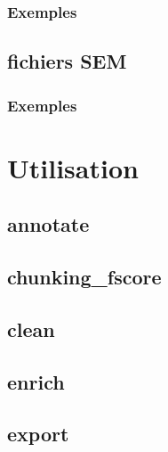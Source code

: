 \documentclass[12pt]{article}
\begin{document}
            \subsubsection{Exemples}
            \label{subsubsec:file-vectorised-examples}
            

        \subsection{fichiers SEM}
        \label{subsec:file-sem}
        

            \subsubsection{Exemples}
            \label{subsubsec:file-sem-examples}
            
    
    \section{Utilisation}
    \label{sec:usage}
    

        \subsection{annotate}
        \label{subsec:module-annotate}
        

        \subsection{chunking\_fscore}
        \label{subsec:module-chunking-fscore}
        

        \subsection{clean}
        \label{subsec:module-clean}
        

        \subsection{enrich}
        \label{subsec:module-enrich}
        

        \subsection{export}
        \label{subsec:module-export}
        
\end{document}
